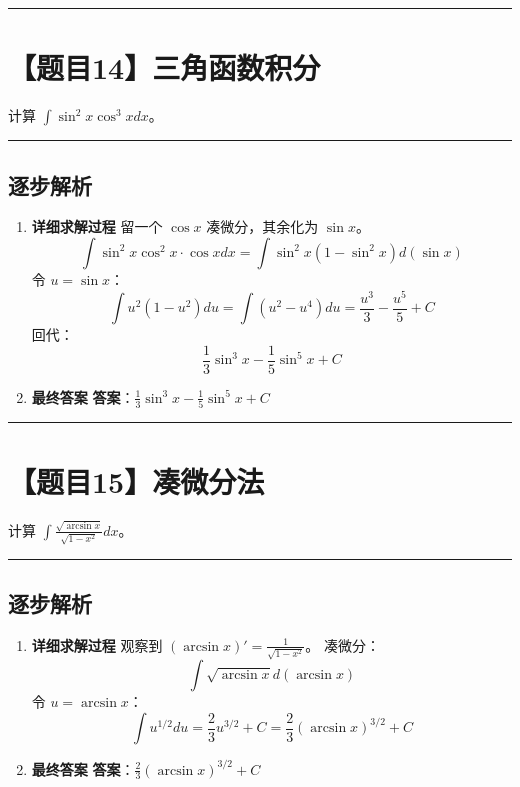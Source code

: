 \documentclass[UTF8]{ctexart}
\newenvironment{redenv}{\color{red}}{}
\newenvironment{detailedanalysis}{%
    \color{red}
    \begin{enumerate}[label=\textbf{第\arabic*步：}, leftmargin=*, align=left, itemsep=1.5ex]
}{%
    \end{enumerate}
}
\newcommand{\problemrule}{\noindent\rule{\textwidth}{1.5pt}\vspace{-0.8em}}
\newcommand{\analysisrule}{\noindent\rule{\textwidth}{0.8pt}\vspace{-0.8em}}
\begin{document}
\problemrule
\section*{【题目14】三角函数积分}
计算 $ \int \sin^{2} x \cos^{3} x dx $。

\begin{redenv}
\analysisrule
\subsection*{逐步解析}

\begin{detailedanalysis}
\item \textbf{详细求解过程}
留一个 $\cos x$ 凑微分，其余化为 $\sin x$。
$$ \int \sin^2 x \cos^2 x \cdot \cos x dx = \int \sin^2 x (1-\sin^2 x) d(\sin x) $$
令 $u = \sin x$：
$$ \int u^2 (1-u^2) du = \int (u^2 - u^4) du = \frac{u^3}{3} - \frac{u^5}{5} + C $$
回代：
$$ \frac{1}{3}\sin^3 x - \frac{1}{5}\sin^5 x + C $$

\item \textbf{最终答案}
\textbf{答案}：$ \frac{1}{3}\sin^3 x - \frac{1}{5}\sin^5 x + C $
\end{detailedanalysis}
\end{redenv}

\problemrule
\section*{【题目15】凑微分法}
计算 $ \int \frac{\sqrt{\arcsin x}}{\sqrt{1-x^{2}}} dx $。

\begin{redenv}
\analysisrule
\subsection*{逐步解析}

\begin{detailedanalysis}
\item \textbf{详细求解过程}
观察到 $(\arcsin x)' = \frac{1}{\sqrt{1-x^2}}$。
凑微分：
$$ \int \sqrt{\arcsin x} d(\arcsin x) $$
令 $u = \arcsin x$：
$$ \int u^{1/2} du = \frac{2}{3} u^{3/2} + C = \frac{2}{3} (\arcsin x)^{3/2} + C $$

\item \textbf{最终答案}
\textbf{答案}：$ \frac{2}{3} (\arcsin x)^{3/2} + C $
\end{detailedanalysis}
\end{redenv}
\end{document}
